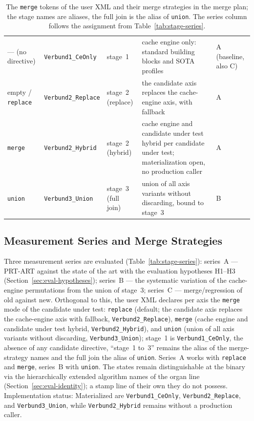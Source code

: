 \begin{nurlang}
\begin{table}[htbp]
\begin{tabular}{@{}ll>{\raggedright\arraybackslash}p{2.2cm}>{\raggedright\arraybackslash}p{4.4cm}>{\raggedright\arraybackslash}p{1.6cm}@{}}
\midrule
--- (no directive) & \texttt{Verbund1\_CeOnly} & stage~1 & cache engine only: standard building blocks and SOTA profiles & A (baseline, also C) \\
empty / \texttt{replace} & \texttt{Verbund2\_Replace} & stage~2 (replace) & the candidate axis replaces the cache-engine axis, with fallback & A \\
\texttt{merge} & \texttt{Verbund2\_Hybrid} & stage~2 (hybrid) & cache engine and candidate under test hybrid per candidate under test; materialization open, no production caller & A \\
\texttt{union} & \texttt{Verbund3\_Union} & stage~3 (full join) & union of all axis variants without discarding, bound to stage~3 & B \\
\bottomrule
\end{tabular}
\caption{The \texttt{merge} tokens of the user XML and their merge strategies in the merge plan; the
stage names are aliases, the full join is the alias of \texttt{union}. The series column follows the
assignment from Table~\ref{tab:stage-series}.}\label{tab:eval-verbund-modi}
\end{table}
\end{nurlang}
\begin{nurkurz}
\subsection{Measurement Series and Merge Strategies}\label{sec:eval-series}
Three measurement series are evaluated (Table~\ref{tab:stage-series}): series~A --- PRT-ART against the
state of the art with the evaluation hypotheses H1--H3 (Section~\ref{sec:eval-hypotheses}); series~B --- the
systematic variation of the cache-engine permutations from the union of stage~3; series~C ---
merge/regression of old against new. Orthogonal to this, the user XML declares per axis the \texttt{merge}
mode of the candidate under test: \texttt{replace} (default; the candidate axis replaces the cache-engine
axis with fallback, \texttt{Verbund2\_Replace}), \texttt{merge} (cache engine and candidate under test
hybrid, \texttt{Verbund2\_Hybrid}), and \texttt{union} (union of all axis variants without discarding,
\texttt{Verbund3\_Union}); stage~1 is \texttt{Verbund1\_CeOnly}, the absence of any candidate directive,
\enquote{stage~1 to~3} remains the alias of the merge-strategy names and the full join the alias of
\texttt{union}. Series~A works with \texttt{replace} and \texttt{merge}, series~B with \texttt{union}. The
states remain distinguishable at the binary via the hierarchically extended algorithm names of the organ
line (Section~\ref{sec:eval-identity}); a stamp line of their own they do not possess. Implementation
status: Materialized are \texttt{Verbund1\_CeOnly}, \texttt{Verbund2\_Replace}, and
\texttt{Verbund3\_Union}, while \texttt{Verbund2\_Hybrid} remains without a production caller.
\end{nurkurz}

